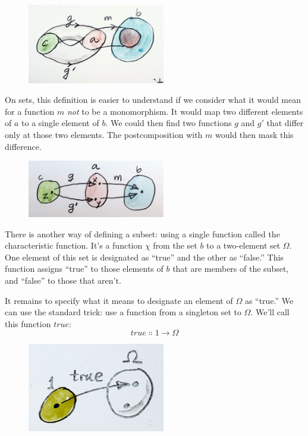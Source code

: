 \begin{figure}[H]
\centering
\includegraphics[width=60mm]{images/monomorphism.jpg}
\end{figure}

\noindent
On sets, this definition is easier to understand if we consider what it
would mean for a function $m$ \emph{not} to be a monomorphism. It
would map two different elements of $a$ to a single element of
$b$. We could then find two functions $g$ and
$g'$ that differ only at those two elements. The
postcomposition with $m$ would then mask this difference.

\begin{figure}[H]
\centering
\includegraphics[width=60mm]{images/notmono.jpg}
\end{figure}

\noindent
There is another way of defining a subset: using a single function
called the characteristic function. It's a function $\chi$ from the
set $b$ to a two-element set $\Omega$. One element of this set
is designated as ``true'' and the other as ``false.'' This function
assigns ``true'' to those elements of $b$ that are members of the
subset, and ``false'' to those that aren't.

It remains to specify what it means to designate an element of
$\Omega$ as ``true.'' We can use the standard trick: use a function
from a singleton set to $\Omega$. We'll call this function
$true$:
\[true \Colon 1 \to \Omega\]

\begin{figure}[H]
\centering
\includegraphics[width=60mm]{images/true.jpg}
\end{figure}

